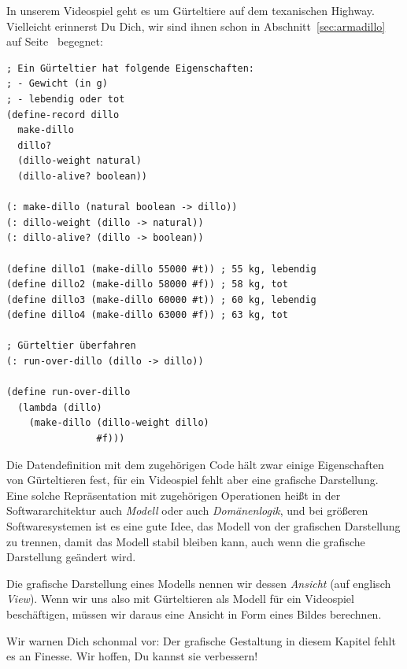 %
In unserem Videospiel geht es um Gürteltiere auf dem texanischen
Highway.  Vielleicht erinnerst Du Dich, wir sind ihnen schon in
Abschnitt~\ref{sec:armadillo} auf Seite~\pageref{sec:armadillo}
begegnet:
%
\begin{lstlisting}
; Ein Gürteltier hat folgende Eigenschaften:
; - Gewicht (in g)
; - lebendig oder tot
(define-record dillo
  make-dillo
  dillo?
  (dillo-weight natural)
  (dillo-alive? boolean))

(: make-dillo (natural boolean -> dillo))
(: dillo-weight (dillo -> natural))
(: dillo-alive? (dillo -> boolean))

(define dillo1 (make-dillo 55000 #t)) ; 55 kg, lebendig 
(define dillo2 (make-dillo 58000 #f)) ; 58 kg, tot
(define dillo3 (make-dillo 60000 #t)) ; 60 kg, lebendig
(define dillo4 (make-dillo 63000 #f)) ; 63 kg, tot

; Gürteltier überfahren
(: run-over-dillo (dillo -> dillo))

(define run-over-dillo
  (lambda (dillo)
    (make-dillo (dillo-weight dillo)
                #f)))
\end{lstlisting}
%
Die Datendefinition mit dem zugehörigen Code hält zwar einige Eigenschaften
von Gürteltieren fest, für ein Videospiel fehlt aber eine
grafische Darstellung.  Eine solche Repräsentation mit
zugehörigen Operationen heißt in der Softwararchitektur auch
\textit{Modell} oder auch
\textit{Domänenlogik}, und bei größeren Softwaresystemen
ist es eine gute Idee, das Modell von der grafischen Darstellung zu
trennen, damit das Modell stabil bleiben kann, auch wenn die grafische
Darstellung geändert wird.

Die grafische Darstellung eines Modells nennen wir dessen
\textit{Ansicht} (auf englisch
\textit{View}).  Wenn wir uns also mit Gürteltieren als
Modell für ein Videospiel beschäftigen, müssen wir daraus eine Ansicht
in Form eines Bildes berechnen.

Wir warnen Dich schonmal vor: Der grafische Gestaltung in diesem
Kapitel fehlt es an Finesse.  Wir hoffen, Du kannst
sie verbessern!


